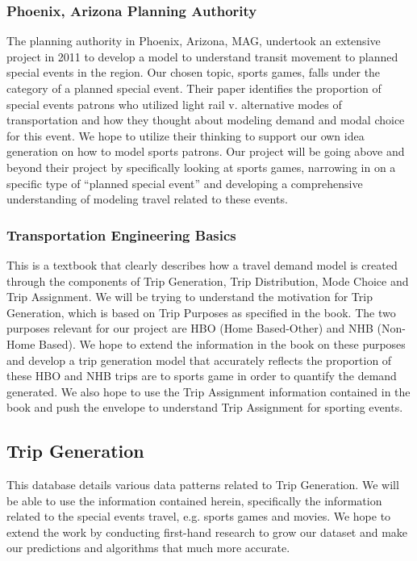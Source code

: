 \documentclass[draft,12pt,titlepage]{article}
\begin{document}
\subsubsection{Phoenix, Arizona Planning Authority}
The planning authority in Phoenix, Arizona, MAG, undertook an extensive project in 2011 to
develop a model to understand transit movement to planned special events in the region. \cite{kuppam11} Our
chosen topic, sports games, falls under the category of a planned special event. Their paper
identifies the proportion of special events patrons who utilized light rail v. alternative modes
of transportation and how they thought about modeling demand and modal choice for this
event. We hope to utilize their thinking to support our own idea generation on how to model
sports patrons. Our project will be going above and beyond their project by specifically
looking at sports games, narrowing in on a specific type of “planned special event” and
developing a comprehensive understanding of modeling travel related to these events.

\subsubsection{Transportation Engineering Basics}
This is a textbook that clearly describes how a travel demand model is created through the
components of Trip Generation, Trip Distribution, Mode Choice and Trip Assignment. \cite{murthy01} We
will be trying to understand the motivation for Trip Generation, which is based on Trip
Purposes as specified in the book. The two purposes relevant for our project are HBO (Home
Based-Other) and NHB (Non-Home Based). We hope to extend the information in the book
on these purposes and develop a trip generation model that accurately reflects the proportion
of these HBO and NHB trips are to sports game in order to quantify the demand generated.
We also hope to use the Trip Assignment information contained in the book and push the
envelope to understand Trip Assignment for sporting events.

\subsection{Trip Generation}
This database details various data patterns related to Trip Generation.\cite{ite08} We will be able to use
the information contained herein, specifically the information related to the special events
travel, e.g. sports games and movies. We hope to extend the work by conducting first-hand
research to grow our dataset and make our predictions and algorithms that much more
accurate.
\end{document}
